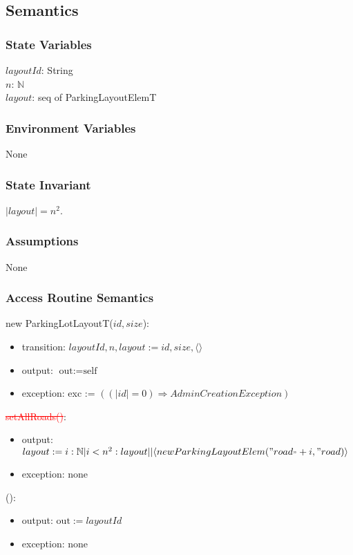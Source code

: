 \documentclass[12pt, titlepage]{article}
\begin{document}
\subsection{Semantics}

\subsubsection{State Variables}
$layoutId$: String \\
$n$: $\mathbb{N}$\\
$layout$: seq of ParkingLayoutElemT

\subsubsection{Environment Variables}
None

\subsubsection{State Invariant}
$|layout| = n^2$.

\subsubsection{Assumptions}
None

\subsubsection{Access Routine Semantics}

\noindent new ParkingLotLayoutT($id, size$):
\begin{itemize}
\item transition: $layoutId, n, layout :=  id, size, \langle \rangle$
\item output: $\text{out} := \text{self}$
\item exception: exc := $((|id| = 0) \Rightarrow AdminCreationException)$
\end{itemize}

\noindent \textcolor{red}{\st{setAllRoads()}}:
\begin{itemize} 
\item output: $layout := i:\mathbb{N} | i < n^2 : layout || \langle new
ParkingLayoutElem("road_" + i, "road) \rangle $
\item exception: none
\end{itemize}

\noindent {}():
\begin{itemize} 
\item output: $\text{out} := layoutId$
\item exception: none
\end{itemize}
\end{document}
